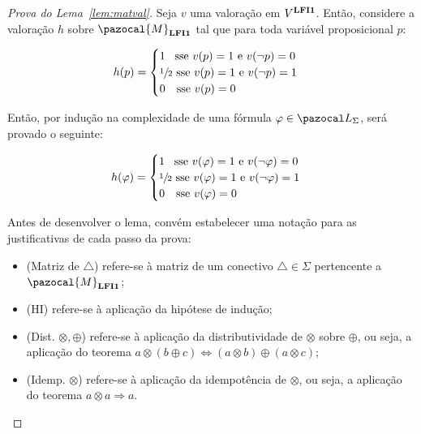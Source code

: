         \begin{proof}[Prova do Lema~\ref{lem:matval}]
            Seja $v$ uma valoração em $V^{{\normalfont\textbf{LFI1}}}$. Então, considere a valoração $h$ sobre $\pazocal{M}_{\lfium}$ tal que para toda variável proposicional $p$:
            \begin{center}
                \begin{equation*}
                    h(p) =
                    \begin{cases}
                    1\ \, \text{ sse } v(p) = 1 \text{ e } v(\neg p) = 0 \\
                    \sfrac{1}{2}{} \text{ sse } v(p) = 1 \text{ e } v(\neg p) = 1 \\
                    0\ \ \text{ sse } v(p) = 0
                    \end{cases}
                \end{equation*}
            \end{center}
            
            
            Então, por indução na complexidade de uma fórmula $\phi \in \ling{}$, será provado o seguinte:
            \begin{center}
                \begin{equation*}
                    h(\varphi) =
                    \begin{cases}
                        1\ \,  \text{ sse } v(\varphi) = 1 \text{ e } v(\neg \varphi) = 0 \\
                        \sfrac{1}{2}{} \text{ sse } v(\varphi) = 1 \text{ e } v(\neg \varphi) = 1 \\
                        0\ \  \text{ sse } v(\varphi) = 0
                    \end{cases}
                \end{equation*}
            \end{center}
            
            \begin{notacao}
                Antes de desenvolver o lema, convém estabelecer uma notação para as justificativas de cada passo da prova:

                \begin{itemize}
                    \item (Matriz de $\triangle$) refere-se à matriz de um conectivo $\triangle \in \Sigma$ pertencente a $\pazocal{M}_{\lfium{}}$;
                    \item (HI) refere-se à aplicação da hipótese de indução;
                    \item (Dist. $\otimes, \oplus$) refere-se à aplicação da distributividade de $\otimes$ sobre $\oplus$, ou seja, a aplicação do teorema $a \otimes (b \oplus c) \Longleftrightarrow (a \otimes b) \oplus (a \otimes c)$;
                    \item (Idemp. $\otimes$) refere-se à aplicação da idempotência de $\otimes$, ou seja, a aplicação do teorema $a \otimes a \Longrightarrow a$.
                \end{itemize}
            \end{notacao}


\end{proof}
